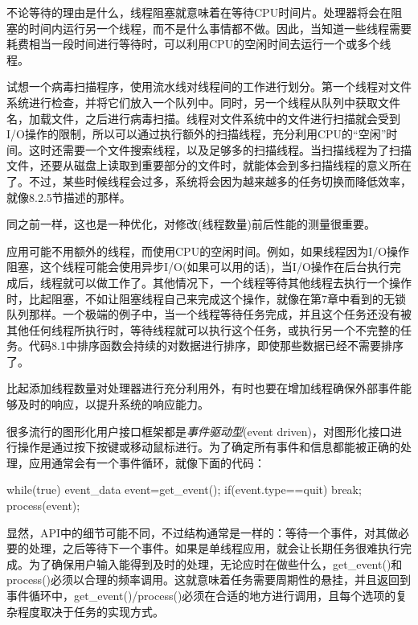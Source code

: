 不论等待的理由是什么，线程阻塞就意味着在等待CPU时间片。处理器将会在阻塞的时间内运行另一个线程，而不是什么事情都不做。因此，当知道一些线程需要耗费相当一段时间进行等待时，可以利用CPU的空闲时间去运行一个或多个线程。

试想一个病毒扫描程序，使用流水线对线程间的工作进行划分。第一个线程对文件系统进行检查，并将它们放入一个队列中。同时，另一个线程从队列中获取文件名，加载文件，之后进行病毒扫描。线程对文件系统中的文件进行扫描就会受到I/O操作的限制，所以可以通过执行额外的扫描线程，充分利用CPU的“空闲”时间。这时还需要一个文件搜索线程，以及足够多的扫描线程。当扫描线程为了扫描文件，还要从磁盘上读取到重要部分的文件时，就能体会到多扫描线程的意义所在了。不过，某些时候线程会过多，系统将会因为越来越多的任务切换而降低效率，就像8.2.5节描述的那样。

同之前一样，这也是一种优化，对修改(线程数量)前后性能的测量很重要。

应用可能不用额外的线程，而使用CPU的空闲时间。例如，如果线程因为I/O操作阻塞，这个线程可能会使用异步I/O(如果可以用的话)，当I/O操作在后台执行完成后，线程就可以做工作了。其他情况下，一个线程等待其他线程去执行一个操作时，比起阻塞，不如让阻塞线程自己来完成这个操作，就像在第7章中看到的无锁队列那样。一个极端的例子中，当一个线程等待任务完成，并且这个任务还没有被其他任何线程所执行时，等待线程就可以执行这个任务，或执行另一个不完整的任务。代码8.1中排序函数会持续的对数据进行排序，即使那些数据已经不需要排序了。

比起添加线程数量对处理器进行充分利用外，有时也要在增加线程确保外部事件能够及时的响应，以提升系统的响应能力。


很多流行的图形化用户接口框架都是\textit{事件驱动型}(event driven)，对图形化接口进行操作是通过按下按键或移动鼠标进行。为了确定所有事件和信息都能被正确的处理，应用通常会有一个事件循环，就像下面的代码：

\begin{cpp}
while(true)
{
  event_data event=get_event();
  if(event.type==quit)
    break;
  process(event);
}
\end{cpp}

显然，API中的细节可能不同，不过结构通常是一样的：等待一个事件，对其做必要的处理，之后等待下一个事件。如果是单线程应用，就会让长期任务很难执行完成。为了确保用户输入能得到及时的处理，无论应时在做些什么，get\_event()和process()必须以合理的频率调用。这就意味着任务需要周期性的悬挂，并且返回到事件循环中，get\_event()/process()必须在合适的地方进行调用，且每个选项的复杂程度取决于任务的实现方式。

